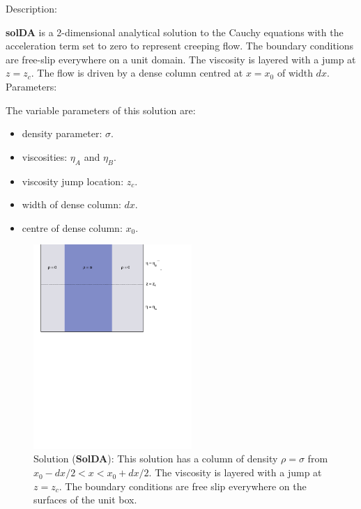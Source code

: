   {\large \fontB Description:}
  
  {\bf solDA} is a 2-dimensional analytical solution to the Cauchy equations with the acceleration term set to zero
  to represent creeping flow. The boundary conditions are free-slip everywhere on a unit domain.
  The viscosity is layered with a jump at $ z=z_c $.
  The flow is driven by a dense column centred at $ x=x_0 $ of width $dx$.
  \\
  
 {\large \fontB Parameters:}
  
 The variable parameters of this solution are:
 \begin{itemize}
   \item{density parameter: $ \sigma $.}
   \item{viscosities: $\eta_A$ and $\eta_B$.}
   \item{viscosity jump location: $z_c$.}
   \item{width of dense column: $dx$.}
   \item{centre of dense column: $x_0$.}
 \end{itemize}

  \begin{figure}
    \includegraphics[width=6cm,clip]{../figs/figDA.pdf}
    \caption[Short caption]{\label{figDA} 
      Solution ({\bf SolDA}):
      This solution has a column of density $\rho = \sigma$ from $x_0-dx/2 < x < x_0+dx/2$.
      The viscosity is layered with a jump at $ z=z_c $.
      The boundary conditions are free slip everywhere on the surfaces of the unit box.}
  \end{figure} 
  

